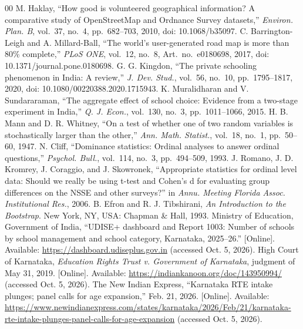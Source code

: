 \documentclass[conference]{IEEEtran}
\begin{document}
\begin{thebibliography}{00}
 M. Haklay, ``How good is volunteered geographical information? A comparative study of OpenStreetMap and Ordnance Survey datasets,'' \textit{Environ. Plan. B}, vol.~37, no.~4, pp.~682--703, 2010, doi: 10.1068/b35097.
 C. Barrington-Leigh and A. Millard-Ball, ``The world's user-generated road map is more than 80\% complete,'' \textit{PLoS ONE}, vol.~12, no.~8, Art.~no.~e0180698, 2017, doi: 10.1371/journal.pone.0180698.
 G. G. Kingdon, ``The private schooling phenomenon in India: A review,'' \textit{J. Dev. Stud.}, vol.~56, no.~10, pp.~1795--1817, 2020, doi: 10.1080/00220388.2020.1715943.
 K. Muralidharan and V. Sundararaman, ``The aggregate effect of school choice: Evidence from a two-stage experiment in India,'' \textit{Q. J. Econ.}, vol.~130, no.~3, pp.~1011--1066, 2015.
 H. B. Mann and D. R. Whitney, ``On a test of whether one of two random variables is stochastically larger than the other,'' \textit{Ann. Math. Statist.}, vol.~18, no.~1, pp.~50--60, 1947.
 N. Cliff, ``Dominance statistics: Ordinal analyses to answer ordinal questions,'' \textit{Psychol. Bull.}, vol.~114, no.~3, pp.~494--509, 1993.
 J. Romano, J. D. Kromrey, J. Coraggio, and J. Skowronek, ``Appropriate statistics for ordinal level data: Should we really be using t-test and Cohen's d for evaluating group differences on the NSSE and other surveys?'' in \textit{Annu. Meeting Florida Assoc. Institutional Res.}, 2006.
 B. Efron and R. J. Tibshirani, \textit{An Introduction to the Bootstrap}. New York, NY, USA: Chapman \& Hall, 1993.
 Ministry of Education, Government of India, ``UDISE+ dashboard and Report 1003: Number of schools by school management and school category, Karnataka, 2025--26.'' [Online]. Available: \url{https://dashboard.udiseplus.gov.in} (accessed Oct. 5, 2026).
 High Court of Karnataka, \textit{Education Rights Trust v. Government of Karnataka}, judgment of May 31, 2019. [Online]. Available: \url{https://indiankanoon.org/doc/143950994/} (accessed Oct. 5, 2026).
 The New Indian Express, ``Karnataka RTE intake plunges; panel calls for age expansion,'' Feb. 21, 2026. [Online]. Available: \url{https://www.newindianexpress.com/states/karnataka/2026/Feb/21/karnataka-rte-intake-plunges-panel-calls-for-age-expansion} (accessed Oct. 5, 2026).
\end{thebibliography}
\end{document}
